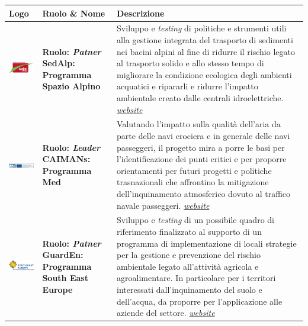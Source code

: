 \begin{longtable}{ p{} | p{} | p{}}

\textbf{Logo}& \textbf{Ruolo \& Nome}&  \textbf{Descrizione}\\

 \endhead
\midrule
\vfill \includegraphics[scale=0.8]{./capitoli/capitolo1/img/alpini} & \vfill \textbf{{\color{Plum}Ruolo}: \textit{Patner}} \newline \vfill \textbf{{\color{ForestGreen}SedAlp}: Programma Spazio Alpino}  &
 Sviluppo e \textit{testing} di politiche e strumenti utili alla gestione integrata del trasporto di sedimenti nei bacini alpini al fine di ridurre il rischio legato al trasporto solido e allo stesso tempo di migliorare la condizione ecologica degli ambienti acquatici e ripararli e ridurre l'impatto ambientale creato dalle centrali idroelettriche. \textit{\href{http://www.alpine-space.eu/}{website}}\\
\midrule
\vfill \includegraphics[scale=0.7]{./capitoli/capitolo1/img/med} & \vfill \textbf{{\color{Plum}Ruolo}: \textit{Leader}} \newline \vfill \textbf{{\color{ForestGreen}CAIMANs}: Programma Med}  & Valutando l'impatto sulla qualità dell'aria da parte delle navi crociera e in generale delle navi passeggeri, il progetto mira a porre le basi per l'identificazione dei punti critici e per proporre orientamenti per futuri progetti e politiche trasnazionali che affrontino la mitigazione dell'inquinamento atmosferico dovuto al traffico navale passeggeri. \textit{\href{http://www.medmaritimeprojects.eu/section/caimans}{website}} \\
\midrule
\vfill \includegraphics[scale=0.7]{./capitoli/capitolo1/img/park} & \vfill \textbf{{\color{Plum}Ruolo}: \textit{Patner}} \newline \vfill \textbf{ {\color{ForestGreen}GuardEn}: Programma South East Europe } & Sviluppo e \textit{testing} di un possibile quadro di riferimento finalizzato al supporto di un programma di implementazione di locali strategie per la gestione e prevenzione del rischio ambientale legato all'attività agricola e agroalimentare. In particolare per i territori interessati dall'inquinamento del suolo e dell'acqua, da proporre per l'applicazione alle aziende del settore. \textit{\href{http://www.southeast-europe.net/en/}{website}}\\

\end{longtable}
